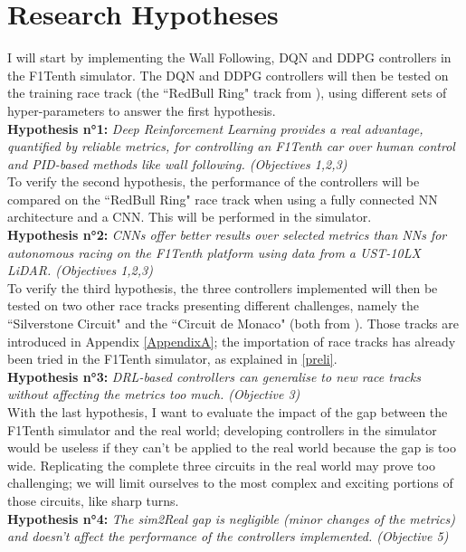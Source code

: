 \section{Research Hypotheses}
\label{reshypo}
I will start by implementing the Wall Following, DQN and DDPG controllers in the F1Tenth simulator. The DQN and DDPG controllers will then be tested on the training race track (the ``RedBull Ring" track from \cite{bosello}), using different sets of hyper-parameters to answer the first hypothesis. \\
\textbf{Hypothesis n°1:} \textit{Deep Reinforcement Learning provides a real advantage, quantified by reliable metrics, for controlling an F1Tenth car over human control and PID-based methods like wall following. (Objectives 1,2,3)} \\
To verify the second hypothesis, the performance of the controllers will be compared on the ``RedBull Ring" race track when using a fully connected NN architecture and a CNN. This will be performed in the simulator. \\
\textbf{Hypothesis n°2:} \textit{CNNs offer better results over selected metrics than NNs for autonomous racing on the F1Tenth platform using data from a UST-10LX LiDAR. (Objectives 1,2,3)}\\
To verify the third hypothesis, the three controllers implemented will then be tested on two other race tracks presenting different challenges, namely the ``Silverstone Circuit" and the ``Circuit de Monaco" (both from \cite{bosello}). Those tracks are introduced in Appendix \ref{AppendixA}; the importation of race tracks has already been tried in the F1Tenth simulator, as explained in \ref{preli}.\\
\textbf{Hypothesis n°3:} \textit{DRL-based controllers can generalise to new race tracks without affecting the metrics too much. (Objective 3)} \\
With the last hypothesis, I want to evaluate the impact of the gap between the F1Tenth simulator and the real world; developing controllers in the simulator would be useless if they can't be applied to the real world because the gap is too wide. Replicating the complete three circuits in the real world may prove too challenging; we will limit ourselves to the most complex and exciting portions of those circuits, like sharp turns.\\
\textbf{Hypothesis n°4:} \textit{The sim2Real gap is negligible (minor changes of the metrics) and doesn't affect the performance of the controllers implemented. (Objective 5)}\\


